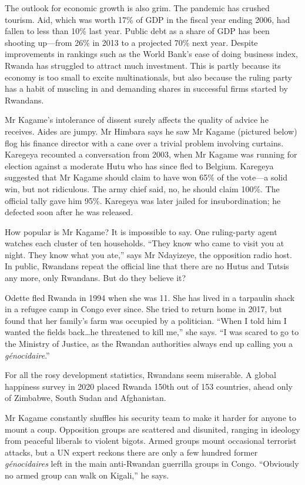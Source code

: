 \documentclass{article}
\begin{document}
The outlook for economic growth is also grim. The pandemic has crushed tourism. Aid, which was worth 17\% of GDP in the fiscal year ending 2006, had fallen to less than 10\% last year. Public debt as a share of GDP has been shooting up---from 26\% in 2013 to a projected 70\% next year. Despite improvements in rankings such as the World Bank's ease of doing business index, Rwanda has struggled to attract much investment. This is partly because its economy is too small to excite multinationals, but also because the ruling party has a habit of muscling in and demanding shares in successful firms started by Rwandans. 

Mr Kagame's intolerance of dissent surely affects the quality of advice he receives. Aides are jumpy. Mr Himbara says he saw Mr Kagame (pictured below) flog his finance director with a cane over a trivial problem involving curtains. Karegeya recounted a conversation from 2003, when Mr Kagame was running for election against a moderate Hutu who has since fled to Belgium. Karegeya suggested that Mr Kagame should claim to have won 65\% of the vote---a solid win, but not ridiculous. The army chief said, no, he should claim 100\%. The official tally gave him 95\%. Karegeya was later jailed for insubordination; he defected soon after he was released. 

How popular is Mr Kagame? It is impossible to say. One ruling-party agent watches each cluster of ten households. ``They know who came to visit you at night. They know what you ate,'' says Mr Ndayizeye, the opposition radio host. In public, Rwandans repeat the official line that there are no Hutus and Tutsis any more, only Rwandans. But do they believe it? 

Odette fled Rwanda in 1994 when she was 11. She has lived in a tarpaulin shack in a refugee camp in Congo ever since. She tried to return home in 2017, but found that her family's farm was occupied by a politician. ``When I told him I wanted the fields back\ldots{}he threatened to kill me,'' she says. ``I was scared to go to the Ministry of Justice, as the Rwandan authorities always end up calling you a \emph{génocidaire}.'' 

For all the rosy development statistics, Rwandans seem miserable. A global happiness survey in 2020 placed Rwanda 150th out of 153 countries, ahead only of Zimbabwe, South Sudan and Afghanistan. 

Mr Kagame constantly shuffles his security team to make it harder for anyone to mount a coup. Opposition groups are scattered and disunited, ranging in ideology from peaceful liberals to violent bigots. Armed groups mount occasional terrorist attacks, but a UN expert reckons there are only a few hundred former \emph{génocidaires} left in the main anti-Rwandan guerrilla groups in Congo. ``Obviously no armed group can walk on Kigali,'' he says. 
\end{document}
